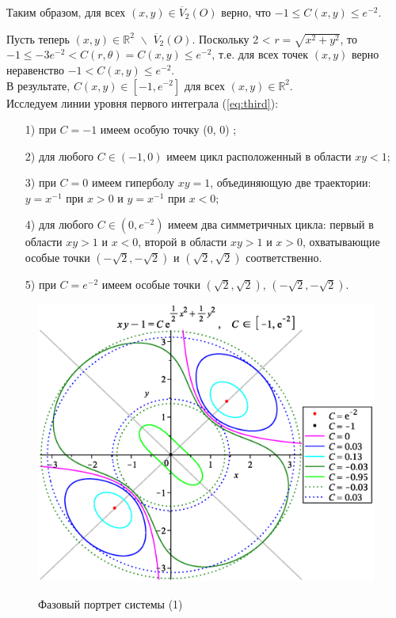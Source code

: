 \documentclass{article}
\begin{document}
Таким образом, для всех $(x,y) \in \overline{V}_2(O) $ верно, что $-1 \leq C(x,y)\leq e^{-2}$.

Пусть теперь $(x, y) \in \mathbb{R}^2\,\, \backslash\,\, \overline{V}_2(O)$. Поскольку 2 < $r = \sqrt{x^2 + y^2}$, то $-1 \leq -3e^{-2} < C(r,\theta) = C(x,y) \leq e^{-2}$, т.е. для всех точек $(x,y)$ верно неравенство $-1 < C(x,y)\leq e^{-2}$.\\

В результате, $C(x,y) \in [-1, e^{-2}]$ для всех $(x,y)\in \mathbb{R}^2$.\\

Исследуем линии уровня первого интеграла (\ref{eq:third}):
\begin{enumerate}
\item[{1)}] при $C = -1$ имеем особую точку (0, 0) ;
\item[{2)}] для любого $C \in (-1, 0)$ имеем цикл расположенный в области $xy<1$;
\item[{3)}] при $C = 0$ имеем гиперболу $xy = 1$, объединяющую две траектории: $y = x^{-1}$ при $x > 0$ и $y = x^{-1}$ при $x < 0$;
\item[{4)}] для любого $C \in (0, e^{-2})$ имеем два симметричных цикла: первый в области $xy>1$ и $x< 0$, второй в области $xy>1$ и $x> 0$, охватывающие особые точки $(-\sqrt{2}, -\sqrt{2})$ и $(\sqrt{2}, \sqrt{2})$ соответственно.
\item[{5)}] при $C = e^{-2}$ имеем особые точки $(\sqrt{2}, \sqrt{2})$, $(-\sqrt{2}, -\sqrt{2})$.
\end{enumerate}

\begin{figure}[ht!]%
    \begin{center}
    {\includegraphics[scale=0.65]{zik.eps} }%
    \caption{Фазовый портрет системы (1)}%
    \label{fig:second}
    \end{center}%
\end{figure}
\end{document}
